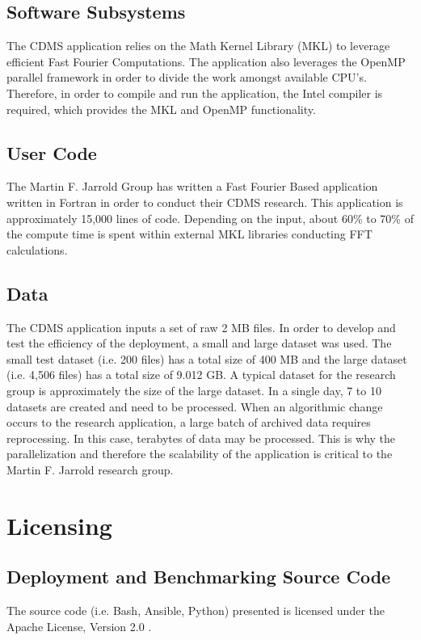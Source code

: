 \documentclass[9pt,twocolumn,twoside]{../../styles/osajnl}
\begin{document}
\subsection{Software Subsystems} \label{software}
The CDMS application relies on the Math Kernel Library (MKL) to
leverage efficient Fast Fourier Computations. The application also
leverages the OpenMP parallel framework in order to divide the work
amongst available CPU's. Therefore, in order to compile and run the
application, the Intel compiler is required, which provides the MKL
and OpenMP functionality.

\subsection{User Code} \label{code}
The Martin F. Jarrold Group has written a Fast Fourier Based
application written in Fortran in order to conduct their CDMS
research. This application is approximately 15,000 lines of
code. Depending on the input, about 60\% to 70\% of the compute time
is spent within external MKL libraries conducting FFT calculations.

\subsection{Data} \label{data}
The CDMS application inputs a set of raw 2 MB files. In order to
develop and test the efficiency of the deployment, a small and large
dataset was used. The small test dataset (i.e. 200 files) has a total
size of 400 MB and the large dataset (i.e. 4,506 files) has a total
size of 9.012 GB. A typical dataset for the research group is
approximately the size of the large dataset. In a single day, 7 to 10
datasets are created and need to be processed. When an algorithmic
change occurs to the research application, a large batch of archived
data requires reprocessing. In this case, terabytes of data may be
processed. This is why the parallelization and therefore the
scalability of the application is critical to the Martin F. Jarrold
research group. 

\section{Licensing} \label{licensing}
\subsection{Deployment and Benchmarking Source Code} \label{source-license}
The source code (i.e. Bash, Ansible, Python) presented is licensed
under the Apache License, Version 2.0 \cite{www-apache-lic}. 
\end{document}
